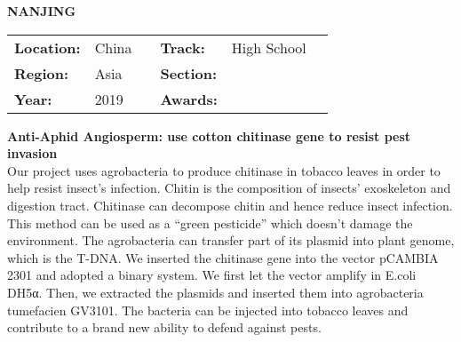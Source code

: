 \textbf{\uppercase{Nanjing}}
\FloatBarrier
\begin{table}[h]
\begin{tabular}{lp{2.5cm}llll}
\textbf{Location:} & China & \multicolumn{1}{|l}{} & \textbf{Track:}   & High School \\
\textbf{Region:}   & Asia   & \multicolumn{1}{|l}{} & \textbf{Section:} &  \\
\textbf{Year:}     & 2019   & \multicolumn{1}{|l}{} & \textbf{Awards:}  &
\end{tabular}
\end{table}
\FloatBarrier
\noindent	\textbf{Anti-Aphid Angiosperm: use cotton chitinase gene to resist pest invasion} \vspace{.2cm}\\
Our project uses agrobacteria to produce chitinase in tobacco leaves in order to help resist insect’s infection. Chitin is the composition of insects’ exoskeleton and digestion tract. Chitinase can decompose chitin and hence reduce insect infection. This method can be used as a “green pesticide” which doesn’t damage the environment. The agrobacteria can transfer part of its plasmid into plant genome, which is the T-DNA. We inserted the chitinase gene into the vector pCAMBIA 2301 and adopted a binary system. We first let the vector amplify in E.coli DH5α. Then, we extracted the plasmids and inserted them into agrobacteria tumefacien GV3101. The bacteria can be injected into tobacco leaves and contribute to a brand new ability to defend against pests.
\vspace{2cm} $ $
\pagebreak

